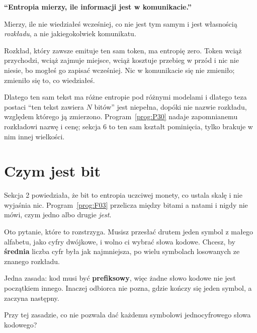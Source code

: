 \begin{fr}
\begin{trapbox}
\textbf{\enquote{Entropia mierzy, ile informacji jest w komunikacie.}}

Mierzy, ile nie wiedziałeś wcześniej, co nie jest tym samym i jest własnością
\emph{rozkładu}, a nie jakiegokolwiek komunikatu.

Rozkład, który zawsze emituje ten sam token, ma entropię zero. Token wciąż
przychodzi, wciąż zajmuje miejsce, wciąż kosztuje przebieg w przód \dash{} i
nic nie niesie, bo mogłeś go zapisać wcześniej. Nic w komunikacie się nie
zmieniło; zmieniło się to, co wiedziałeś.

Dlatego ten sam tekst ma różne entropie pod różnymi modelami i dlatego teza
postaci \enquote{ten tekst zawiera $N$ bitów} jest niepełna, dopóki nie nazwie
rozkładu, względem którego ją zmierzono. Program~\ref{prog:P30} nadaje
zapomnianemu rozkładowi nazwę i cenę; sekcja 6 to ten sam kształt pominięcia,
tylko brakuje w nim innej wielkości.
\end{trapbox}
\end{fr}

\section{Czym jest bit}
\label{sec:P29-code}

\begin{fr}
Sekcja 2 powiedziała, że bit to entropia uczciwej monety, co ustala skalę i
nie wyjaśnia nic. Program~\ref{prog:F03} przelicza między bitami a natami i
nigdy nie mówi, czym jedno albo drugie \emph{jest}.

Oto pytanie, które to rozstrzyga. Musisz przesłać drutem jeden symbol z małego
alfabetu, jako cyfry dwójkowe, i wolno ci wybrać słowa kodowe. Chcesz, by
\textbf{średnia} liczba cyfr była jak najmniejsza, po wielu symbolach
losowanych ze znanego rozkładu.

Jedna zasada: kod musi być \textbf{prefiksowy}, więc żadne słowo kodowe nie
jest początkiem innego. Inaczej odbiorca nie pozna, gdzie kończy się jeden
symbol, a zaczyna następny.

Przy tej zasadzie, co nie pozwala dać każdemu symbolowi jednocyfrowego słowa
kodowego?
\dotline
\nextframe
\end{fr}

